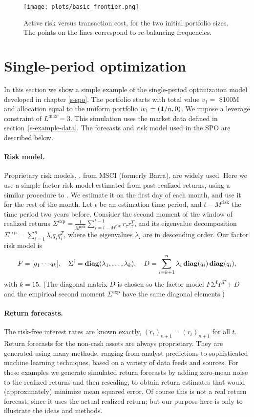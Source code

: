 \documentclass[openany]{article}  %
\renewcommand{\S}{section~}
\begin{document}
\begin{figure}
\begin{center}
\texttt{[image: plots/basic\_frontier.png]}
\end{center}
\caption{
Active risk
versus transaction cost, for the two initial portfolio sizes.
The points on the lines correspond to re-balancing frequencies.
}
\label{fig:basic-frontier}
\end{figure}

\section{Single-period optimization}
\label{s-example-spo}
In this section we show a simple example of the
single-period optimization model developed in chapter \ref{s-spo}.
The portfolio starts with total value $v_1 =$ \$100M and allocation
equal to the uniform portfolio $w_1 =(\mathbf 1/n,0)$.
We impose a leverage constraint of $L^\mathrm{max}=3$.
This simulation uses the market data defined in \S\ref{s-example-data}.
The forecasts and risk model used in the SPO are described below.

\paragraph{Risk model.}
Proprietary risk models, \eg,
from MSCI (formerly Barra), are widely used.
Here we use a simple factor risk model
estimated from past realized returns, using a similar
procedure to \cite{almgren09}.
We estimate it on the first day of each month, and use it for the rest of the month.
Let $t$ be an estimation time period,
and $t-M^\text{risk}$ the time period two years before.
Consider the second moment of the window of realized returns
$\Sigma^\text{exp} = \frac{1}{M^\text{risk}} \sum_{\tau = t-M^\text{risk}}^{t-1}r_{\tau}r_\tau^T$,
and its eigenvalue decomposition $\Sigma^\text{exp} = \sum_{i=1}^n \lambda_i q_i q_i^T$,
where the eigenvalues $\lambda_i$ are in descending order. Our factor risk model is
\[
F=[q_1 \cdots q_k], \quad
\Sigma^\mathrm{f} = \mathop{\bf diag}(\lambda_1, \ldots, \lambda_k), \quad
D = \sum_{i=k+1}^n \lambda_i \mathop{\bf diag}( q_i )\mathop{\bf diag}( q_i ),
\]
with $k=15$.
(The diagonal matrix $D$ is chosen so the factor model $F \Sigma^\mathrm{f} F^T + D$ and
the empirical second moment $\Sigma^\text{exp}$
have the same diagonal elements.)

\paragraph{Return forecasts.}
The risk-free interest rates are known exactly,
$(\hat r_t)_{n+1} = (r_t)_{n+1}$ for all $t$.
Return forecasts for the non-cash assets are always proprietary.
They are generated using many methods,
ranging from analyst predictions to sophisticated machine learning
techniques, based on a variety of data feeds and sources.
For these examples we generate simulated return forecasts
by  adding zero-mean noise to the realized returns
and then rescaling, to obtain return estimates that would (approximately) minimize
mean squared error.
Of course this is not a real return forecast, since it uses the actual realized return;
but our purpose here is only to illustrate the ideas and methods.
\end{document}
